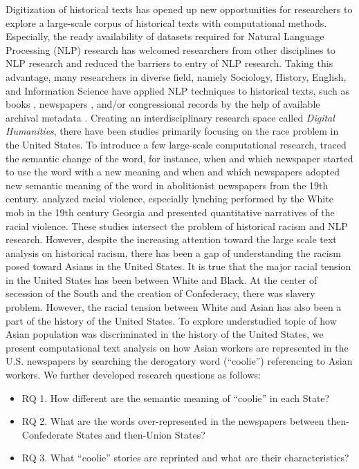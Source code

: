 \documentclass[11pt]{article}
\begin{document}
Digitization of historical texts has opened up new opportunities for 
researchers to explore a large-scale corpus of historical texts
with computational methods. Especially, the ready availability
of datasets required for Natural Language Processing (NLP) research 
has welcomed researchers from other disciplines to NLP research \cite{park2022raison,park2023ripple} 
and reduced the barriers to entry of NLP research.
Taking this advantage, many researchers in diverse field,
namely Sociology, History, English, and Information Science 
have applied NLP techniques to historical texts, such as books \cite{parulian2022uncovering}, 
newspapers \cite{smith2013infectious,pedrazzini2022machines,santin2016or},
and/or congressional records \cite{lin2022enhancing, guldi2019parliament}
by the help of available archival metadata \cite{dobreski2019remodeling}.
Creating an interdisciplinary research space called \textit{Digital Humanities}, 
there have been studies primarily focusing on the race problem in the United States.
To introduce a few large-scale computational research, 
\citet{soni2021abolitionist} traced the semantic change of the word, for instance,
when and which newspaper started to use the word with a new meaning and when and which
newspapers adopted new semantic meaning of the word in abolitionist newspapers from the 19th century. 
\citet{franzosi2012ways} analyzed racial violence, especially lynching performed by the White mob
in the 19th century Georgia and presented quantitative narratives of the racial violence.
These studies intersect the problem of historical racism and NLP research.
However, despite the increasing attention toward the large scale text analysis on 
historical racism, there has been a gap of understanding the racism posed toward Asians in the United States.
It is true that the major racial tension in the United States has been between White and Black.
At the center of secession of the South and the creation of Confederacy, there was slavery problem. 
However, the racial tension between White and Asian has also been a part of the history of the United States.
To explore understudied topic of how Asian population was discriminated
in the history of the United States, we present computational text analysis on how Asian workers are represented in
the U.S. newspapers by searching the derogatory word (``coolie'') referencing to Asian workers. 
We further developed research questions as follows:

\begin{itemize}
  \item RQ 1. How different are the semantic meaning of ``coolie'' in each State? 
  \item RQ 2. What are the words over-represented in the newspapers between then-Confederate States and then-Union States?
  \item RQ 3. What ``coolie'' stories are reprinted and what are their characteristics?
\end{itemize}
\end{document}
